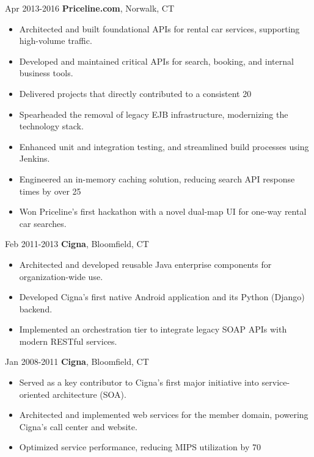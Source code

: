 \documentclass[a4paper,online]{adcv}
\begin{document}
\begin{adcvtabletwo}
  \adcvrowskip
  \adcvrowskip
   {Apr 2013-2016}
  {\textbf{Priceline.com}, Norwalk, CT}
  \begin{itemize}
    \item Architected and built foundational APIs for rental car services, supporting high-volume traffic.
    \item Developed and maintained critical APIs for search, booking, and internal business tools.
    \item Delivered projects that directly contributed to a consistent 20%
    \item Spearheaded the removal of legacy EJB infrastructure, modernizing the technology stack.
    \item Enhanced unit and integration testing, and streamlined build processes using Jenkins.
    \item Engineered an in-memory caching solution, reducing search API response times by over 25%
    \item Won Priceline's first hackathon with a novel dual-map UI for one-way rental car searches.
  \end{itemize}
  \adcvrowskip

  \adcvrowskip
  \adcvrowskip
   {Feb 2011-2013}
  {\textbf{Cigna}, Bloomfield, CT}
  \begin{itemize}
    \item Architected and developed reusable Java enterprise components for organization-wide use.
    \item Developed Cigna's first native Android application and its Python (Django) backend.
    \item Implemented an orchestration tier to integrate legacy SOAP APIs with modern RESTful services.
  \end{itemize}
  \adcvrowskip
  
  \adcvrowskip
  \adcvrowskip
   {Jan 2008-2011}
  {\textbf{Cigna}, Bloomfield, CT}
  \begin{itemize}
    \item Served as a key contributor to Cigna's first major initiative into service-oriented architecture (SOA).
    \item Architected and implemented web services for the member domain, powering Cigna's call center and website.
    \item Optimized service performance, reducing MIPS utilization by 70%
  \end{itemize}
  \adcvrowskip
  

\end{adcvtabletwo}
\end{document}
